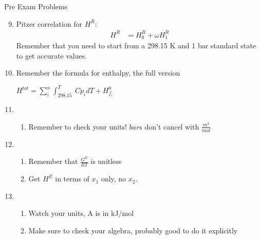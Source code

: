 \documentclass[a4paper]{article}
\begin{document}
Pre Exam Problems
\begin{enumerate}
		\setcounter{enumi}{8}
\item Pitzer correlation for $H^R$:
	\begin{eqnarray}
		H^R&=H_{0}^{R}+\omega H_{1}^R
		\label{9}
	\end{eqnarray} 
	Remember that you need to start from a 298.15 K and 1 bar standard state to get accurate values.

\item Remember the formula for enthalpy, the full version
	
	$H^{tot}=\sum_{i}^{n} \int_{298.15}^{T}\: Cp_i dT + H_{f_i}^0$
\item \begin{enumerate}
		\item Remember to check your units! $bar$s don't cancel with $\frac{m^3}{mol}$

	\end{enumerate}
\item \begin{enumerate}
		\item Remember that $\frac{G^E}{RT}$ is unitless
		\item Get $H^E$ in terms of $x_1$ only, no $x_2$.
	\end{enumerate}


\item \begin{enumerate}
		\item Watch your units, A is in kJ/mol
		\item Make sure to check your algebra, probably good to do it explicitly
	\end{enumerate}
\end{enumerate}
\end{document}
